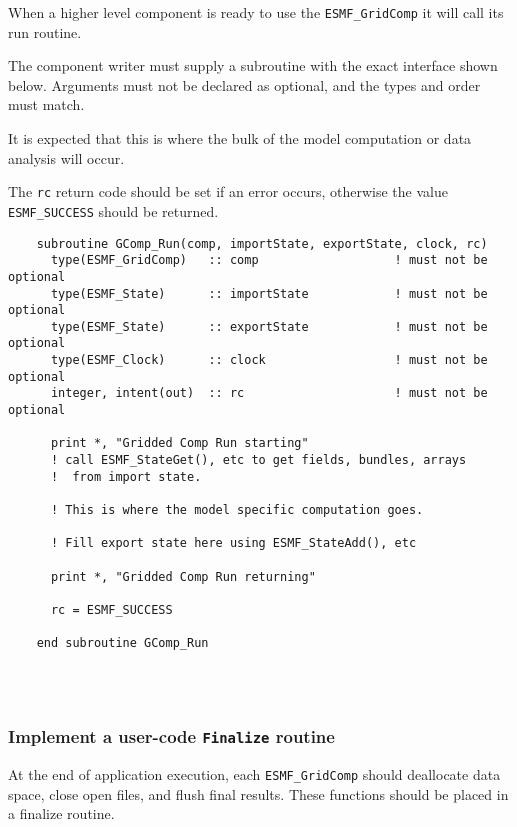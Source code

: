    When a higher level component is ready to use the {\tt ESMF\_GridComp}
   it will call its run routine.
  
   The component writer must supply a subroutine with the exact interface 
   shown below. Arguments must not be declared as optional, and the types and
   order must match.
  
   It is expected that this is where the bulk of the model computation
   or data analysis will occur.
     
   The {\tt rc} return code should be set if an error occurs, otherwise
   the value {\tt ESMF\_SUCCESS} should be returned. 

 \begin{verbatim}
    subroutine GComp_Run(comp, importState, exportState, clock, rc)
      type(ESMF_GridComp)   :: comp                   ! must not be optional
      type(ESMF_State)      :: importState            ! must not be optional
      type(ESMF_State)      :: exportState            ! must not be optional
      type(ESMF_Clock)      :: clock                  ! must not be optional
      integer, intent(out)  :: rc                     ! must not be optional

      print *, "Gridded Comp Run starting"
      ! call ESMF_StateGet(), etc to get fields, bundles, arrays
      !  from import state.

      ! This is where the model specific computation goes.

      ! Fill export state here using ESMF_StateAdd(), etc

      print *, "Gridded Comp Run returning"

      rc = ESMF_SUCCESS

    end subroutine GComp_Run
 
\end{verbatim}
 
 
\mbox{}\hrulefill\ 
 

  \subsubsection{Implement a user-code {\tt Finalize} routine}
   
   \label{sec:GridFinalize}
  
   At the end of application execution, each {\tt ESMF\_GridComp} should
   deallocate data space, close open files, and flush final results.
   These functions should be placed in a finalize routine.
  
